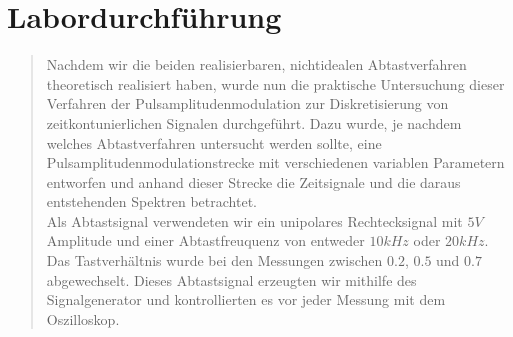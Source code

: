 
    
    \section{Labordurchführung}
    \begin{quote}
         
         Nachdem wir die beiden realisierbaren, nichtidealen Abtastverfahren
         theoretisch realisiert haben, wurde nun die praktische Untersuchung
         dieser Verfahren der Pulsamplitudenmodulation zur Diskretisierung von
         zeitkontunierlichen Signalen durchgeführt. Dazu wurde, je nachdem
         welches Abtastverfahren untersucht werden sollte, eine
         Pulsamplitudenmodulationstrecke mit verschiedenen variablen Parametern
         entworfen und anhand dieser Strecke die Zeitsignale und die daraus
         entstehenden Spektren betrachtet.\\
         
         Als Abtastsignal verwendeten wir ein unipolares Rechtecksignal mit $5V$
         Amplitude und einer Abtastfreuquenz von entweder $10 kHz$ oder $20
         kHz$. Das Tastverhältnis wurde bei den Messungen zwischen $0.2$, $0.5$
         und $0.7$ abgewechselt. Dieses Abtastsignal erzeugten wir mithilfe des
         Signalgenerator und kontrollierten es vor jeder Messung mit dem
         Oszilloskop.\\
         

\end{quote}

